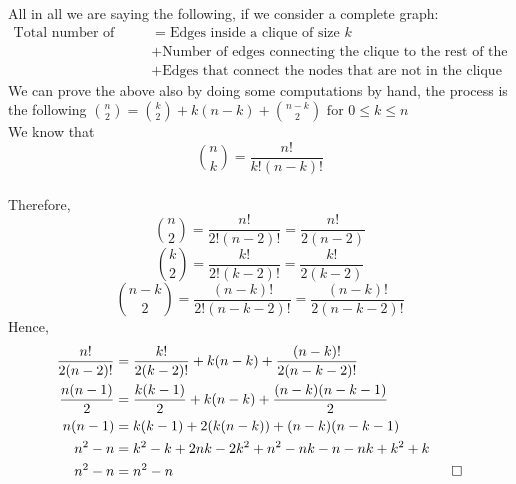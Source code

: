 \begin{enumerate}[a)]
\begin{enumerate}
\begin{center}
\begin{tikzpicture}
\end{tikzpicture}   
\end{center}
\end{enumerate}
All in all we are saying the following, if we consider a complete graph:
\begin{align*}
    \text{Total number of edges} &= \text{Edges inside a clique of size $k$} \\ &+ \text{Number of edges connecting the clique to the rest of the graph} \\ &+ \text{Edges that connect the nodes that are not in the clique}
\end{align*}
We can prove the above also by doing some computations by hand, the process is the following 
$\binom{n}{2} = \binom{k}{2} + k(n-k) + \binom{n-k}{2} \text{ for } 0 \leq k \leq n $ \\
\linebreak 
We know that \begin{equation}\binom{n}{k} = \frac{n!}{k!(n-k)!}\end{equation} \\ 
Therefore, \\
\linebreak 
\begin{equation}
    \binom{n}{2} = \frac{n!}{2!(n-2)!} = \frac{n!}{2(n-2)}
\end{equation}
\begin{equation}
    \binom{k}{2} = \frac{k!}{2!(k-2)!} = \frac{k!}{2(k-2)}
\end{equation}
\begin{equation}
    \binom{n-k}{2} = \frac{(n-k)!}{2!(n-k-2)!} = \frac{(n-k)!}{2(n-k-2)!}
\end{equation}
Hence, 
\begin{align}
\notag
    \frac{n!}{2(n-2)!} &= \frac{k!}{2(k-2)!} + k(n-k) + \frac{(n-k)!}{2(n-k-2)!} \\
    \notag
    \frac{n(n-1)}{2} &= \frac{k(k-1)}{2} + k(n-k) + \frac{(n-k)(n-k-1)}{2} \\
    \notag
    n(n-1) &= k(k-1) + 2(k(n-k)) + (n-k)(n-k-1) \\
    \notag
    n^2 - n &= k^2 - k + 2nk - 2k^2 + n^2 - nk - n - nk + k^2 + k \\
    n^2 - n &= n^2 - n \hspace{7cm} \square
\end{align}
    

\end{enumerate}
